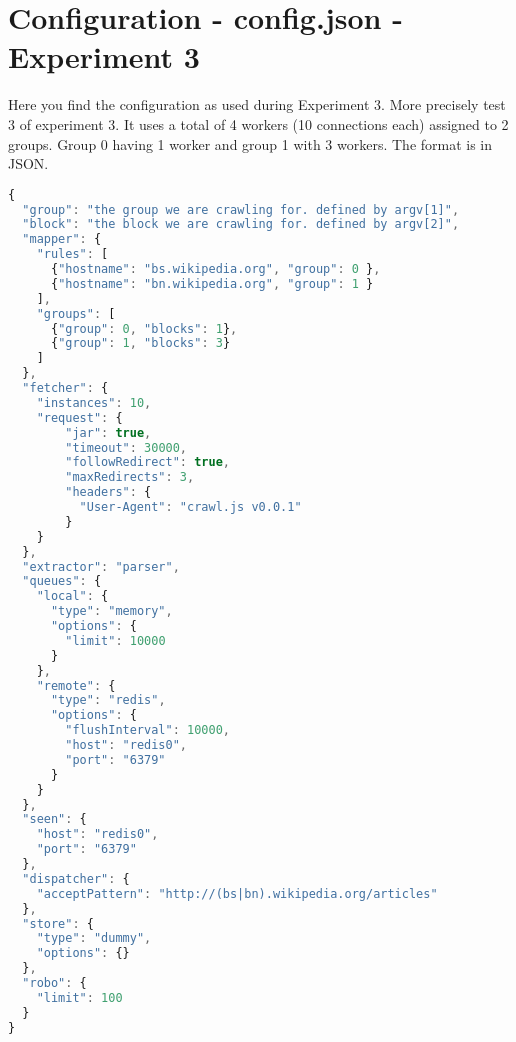 
\chapter{Configuration - config.json - Experiment 3} %
\label{appendix:config.json} %

Here you find the configuration as used during Experiment 3. More precisely test 3 of experiment 3. It uses a total of 4 workers (10 connections each) assigned to 2 groups. Group 0 having 1 worker and group 1 with 3 workers.
\newline
The format is in JSON.\cite{wiki:json}
\begin{lstlisting}[language=JavaScript]
{
  "group": "the group we are crawling for. defined by argv[1]",
  "block": "the block we are crawling for. defined by argv[2]",
  "mapper": {
    "rules": [
      {"hostname": "bs.wikipedia.org", "group": 0 },
      {"hostname": "bn.wikipedia.org", "group": 1 }
    ],
    "groups": [
      {"group": 0, "blocks": 1},
      {"group": 1, "blocks": 3}
    ]
  },
  "fetcher": {
    "instances": 10,
    "request": {
        "jar": true,
        "timeout": 30000,
        "followRedirect": true,
        "maxRedirects": 3,
        "headers": {
          "User-Agent": "crawl.js v0.0.1"
        }
    }
  },
  "extractor": "parser",
  "queues": {
    "local": {
      "type": "memory",
      "options": {
        "limit": 10000
      }
    },
    "remote": {
      "type": "redis",
      "options": {
        "flushInterval": 10000,
        "host": "redis0",
        "port": "6379"
      }
    }
  },
  "seen": {
    "host": "redis0",
    "port": "6379"
  },
  "dispatcher": {
    "acceptPattern": "http://(bs|bn).wikipedia.org/articles"
  },
  "store": {
    "type": "dummy",
    "options": {}
  },
  "robo": {
    "limit": 100
  }
}
\end{lstlisting}